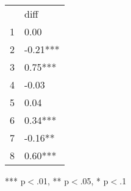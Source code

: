 \documentclass{article}
\begin{document}
\begin{table}[!h]
\centering
\begin{tabular}{ll}
\cline{1-2}
\multicolumn{1}{|l}{} &
  \multicolumn{1}{|l|}{diff} \\
\cline{1-2}
\multicolumn{1}{|l}{1} &
  \multicolumn{1}{|l|}{0.00} \\
\cline{1-2}
\multicolumn{1}{|l}{2} &
  \multicolumn{1}{|l|}{-0.21***} \\
\cline{1-2}
\multicolumn{1}{|l}{3} &
  \multicolumn{1}{|l|}{0.75***} \\
\cline{1-2}
\multicolumn{1}{|l}{4} &
  \multicolumn{1}{|l|}{-0.03} \\
\cline{1-2}
\multicolumn{1}{|l}{5} &
  \multicolumn{1}{|l|}{0.04} \\
\cline{1-2}
\multicolumn{1}{|l}{6} &
  \multicolumn{1}{|l|}{0.34***} \\
\cline{1-2}
\multicolumn{1}{|l}{7} &
  \multicolumn{1}{|l|}{-0.16**} \\
\cline{1-2}
\multicolumn{1}{|l}{8} &
  \multicolumn{1}{|l|}{0.60***} \\
\cline{1-2}
\end{tabular}

\footnotesize{
*** p$<$.01, ** p$<$.05, * p$<$.1
}
\end{table}
\end{document}

